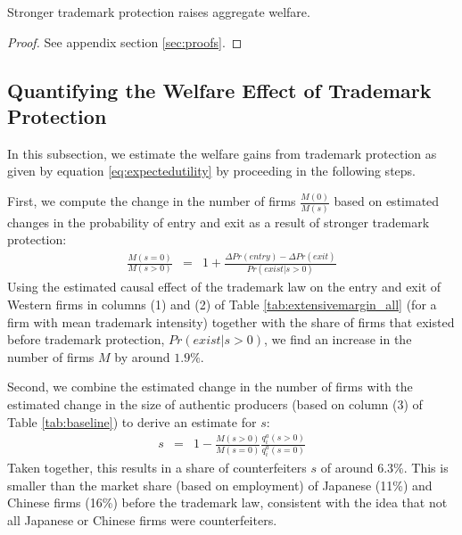 \documentclass[12pt]{article}
\begin{document}
\begin{proposition} \label{prop:welfare_s}
Stronger trademark protection raises aggregate welfare.
\end{proposition}

\begin{proof}
See appendix section \ref{sec:proofs}.
\end{proof}


\subsection{Quantifying the Welfare Effect of Trademark Protection}

In this subsection, we estimate the welfare gains from trademark protection as given by equation \eqref{eq:expectedutility} by proceeding in the following steps.

First, we compute the change in the number of firms $\frac{M(0)}{M(s)}$ based on estimated changes in the probability of entry and exit as a result of stronger trademark protection:
\begin{eqnarray}
     \frac{M(s=0)}{M(s>0)} &=& 1 + \frac{\Delta Pr(entry) - \Delta Pr(exit)}{Pr(exist|s>0)}
\end{eqnarray}
Using the estimated causal effect of the trademark law on the entry and exit of Western firms in columns (1) and (2) of Table 	\ref{tab:extensivemargin_all} (for a firm with mean trademark intensity) together with the share of firms that existed before trademark protection, $Pr(exist|s>0)$, we find an increase in the number of firms $M$ by around $1.9\%$.

Second, we combine the estimated  change in the number of firms with the estimated change in the size of authentic producers (based on column (3) of Table \ref{tab:baseline}) to derive an estimate for $s$:
\begin{eqnarray}
s & = & 1- \frac{M(s>0)}{M(s=0)} \frac{q_i^a (s>0)}{q_i^a (s=0)}
\end{eqnarray} 
Taken together, this results in a share of counterfeiters $s$ of around $6.3\%$. This is smaller than the market share (based on employment) of Japanese (11\%) and Chinese firms (16\%) before the trademark law, consistent with the idea that not all Japanese or Chinese firms were counterfeiters.
\end{document}

